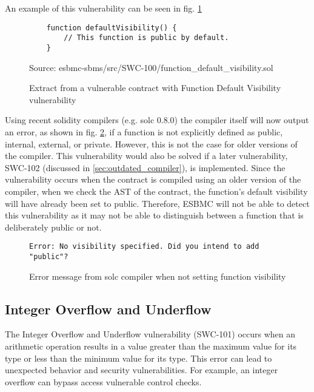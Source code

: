 An example of this vulnerability can be seen in fig. \ref{fig:default_visibility}

\begin{figure}
\begin{lstlisting}
    function defaultVisibility() {
        // This function is public by default.
    }
\end{lstlisting}
\caption{Extract from a vulnerable contract with Function Default Visibility vulnerability }
Source: esbmc-sbms/src/SWC-100/function\_default\_visibility.sol
\label{fig:default_visibility}
\end{figure}



Using recent solidity compilers (e.g. solc 0.8.0) the compiler itself will now output an error, as shown in fig. \ref{fig:default_visibility_error}, if a function is not explicitly defined as public, internal, external, or private. However, this is not the case for older versions of the compiler. This vulnerability would also be solved if a later vulnerability, SWC-102 (discussed in \ref{sec:outdated_compiler}), is implemented.
Since the vulnerability occurs when the contract is compiled using an older version of the compiler, when we check the AST of the contract, the function's default visibility will have already been set to public. Therefore, ESBMC will not be able to detect this vulnerability as it may not be able to distinguish between a function that is deliberately public or not.
\begin{figure}
\begin{lstlisting}
Error: No visibility specified. Did you intend to add "public"?
\end{lstlisting}
\caption{Error message from solc compiler when not setting function visibility}
\label{fig:default_visibility_error}
\end{figure}

\subsection{Integer Overflow and Underflow}
\label{sec:integer_overflow}



The Integer Overflow and Underflow vulnerability (SWC-101) occurs when an arithmetic operation results in a value greater than the maximum value for its type or less than the minimum value for its type. This error can lead to unexpected behavior and security vulnerabilities. For example, an integer overflow can bypass access vulnerable control checks. 


